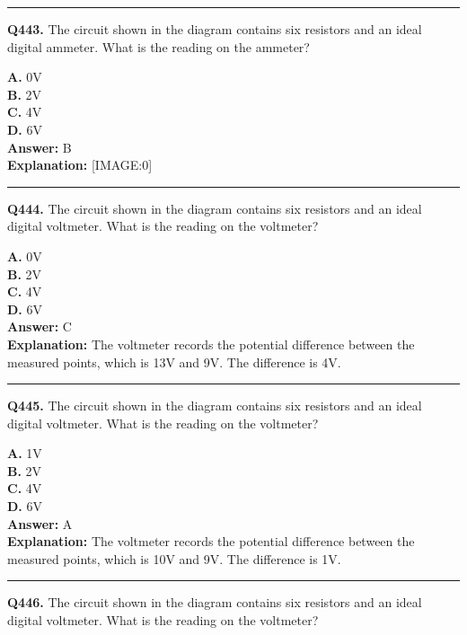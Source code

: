\documentclass[12pt]{article}
\begin{document}
\hrule
\vspace{1em}


\noindent
\textbf{Q443.} The circuit shown in the diagram contains six resistors and an ideal digital ammeter.
What is the reading on the ammeter?



\textbf{A.} 0V \\
\textbf{B.} 2V \\
\textbf{C.} 4V \\
\textbf{D.} 6V \\

\textbf{Answer:} B \\
\textbf{Explanation:} [IMAGE:0]

\hrule
\vspace{1em}


\noindent
\textbf{Q444.} The circuit shown in the diagram contains six resistors and an ideal digital voltmeter.
What is the reading on the voltmeter?



\textbf{A.} 0V \\
\textbf{B.} 2V \\
\textbf{C.} 4V \\
\textbf{D.} 6V \\

\textbf{Answer:} C \\
\textbf{Explanation:} The voltmeter records the potential difference between the measured points, which is 13V and 9V. The difference is 4V.

\hrule
\vspace{1em}


\noindent
\textbf{Q445.} The circuit shown in the diagram contains six resistors and an ideal digital voltmeter.
What is the reading on the voltmeter?



\textbf{A.} 1V \\
\textbf{B.} 2V \\
\textbf{C.} 4V \\
\textbf{D.} 6V \\

\textbf{Answer:} A \\
\textbf{Explanation:} The voltmeter records the potential difference between the measured points, which is 10V and 9V. The difference is 1V.

\hrule
\vspace{1em}


\noindent
\textbf{Q446.} The circuit shown in the diagram contains six resistors and an ideal digital voltmeter.
What is the reading on the voltmeter?
\end{document}
